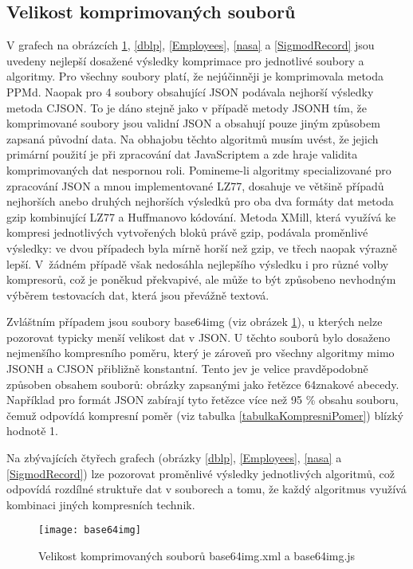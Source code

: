 \subsection{Velikost komprimovaných souborů}
V grafech na obrázcích \ref{base64img}, \ref{dblp}, \ref{Employees}, \ref{nasa} a \ref{SigmodRecord} jsou uvedeny nejlepší dosažené výsledky komprimace pro jednotlivé soubory a algoritmy. Pro všechny soubory platí, že nejúčinněji je komprimovala metoda PPMd. Naopak pro 4 soubory obsahující JSON podávala nejhorší výsledky metoda CJSON. To je dáno stejně jako v případě metody JSONH tím, že komprimované soubory jsou validní JSON a obsahují pouze jiným způsobem zapsaná původní data. Na obhajobu těchto algoritmů musím uvést, že jejich primární použití je při zpracování dat JavaScriptem a zde hraje validita komprimovaných dat nespornou roli. Pomineme-li algoritmy specializované pro zpracování JSON a mnou implementované LZ77, dosahuje ve většině případů nejhorších anebo druhých nejhorších výsledků pro oba dva formáty dat metoda gzip kombinující LZ77 a Huffmanovo kódování. Metoda XMill, která využívá ke kompresi jednotlivých vytvořených bloků právě gzip, podávala proměnlivé výsledky: ve dvou případech byla mírně horší než gzip, ve třech naopak výrazně lepší. V~žádném případě však nedosáhla nejlepšího výsledku i pro různé volby kompresorů, což je poněkud překvapivé, ale může to být způsobeno nevhodným výběrem testovacích dat, která jsou převážně textová.

Zvláštním případem jsou soubory base64img (viz obrázek \ref{base64img}), u kterých nelze pozorovat typicky menší velikost dat v JSON. U těchto souborů bylo dosaženo nejmenšího kompresního poměru, který je zároveň pro všechny algoritmy mimo JSONH a CJSON přibližně konstantní. Tento jev je velice pravděpodobně způsoben obsahem souborů: obrázky zapsanými jako řetězce 64znakové abecedy. Například pro formát JSON zabírají tyto řetězce více než 95 \% obsahu souboru, čemuž odpovídá kompresní poměr (viz tabulka \ref{tabulkaKompresniPomer}) blízký hodnotě 1.

Na zbývajících čtyřech grafech (obrázky \ref{dblp}, \ref{Employees}, \ref{nasa} a \ref{SigmodRecord}) lze pozorovat proměnlivé výsledky jednotlivých algoritmů, což odpovídá rozdílné struktuře dat v souborech a tomu, že každý algoritmus využívá kombinaci jiných kompresních technik.

\begin{figure}[!h]
\centering
\texttt{[image: base64img]}
\caption{Velikost komprimovaných souborů base64img.xml a base64img.js}
\label{base64img}
\end{figure}


